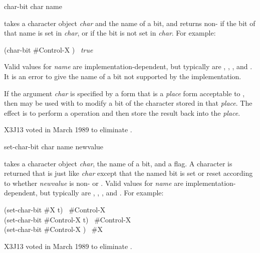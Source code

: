 \begin{obsolete}
\begin{defun}[Function]
char-bit char name

 takes a character object {\it char} and the name of a bit,
and returns non-{\false} if the bit of that name is set in {\it char},
or {\false} if the bit is not set in {\it char}.
For example:
\begin{lisp}
(char-bit \#{\Xbackslash}Control-X ) \EV\ {\it true}
\end{lisp}
Valid values for {\it name}
are implementation-dependent, but typically are ,
, , and .
It is an error to give  the name of a bit not supported
by the implementation.

If the argument {\it char} is specified by a form that is a {\it place} form
acceptable to ,
then  may be used with 
to modify a bit of the character stored in that
{\it place}.
The effect is to perform a  operation
and then store the result back into the {\it place}.
\end{defun}
\end{obsolete}

\begin{newer}
X3J13 voted in March 1989 
to eliminate .
\end{newer}


\begin{obsolete}
\begin{defun}[Function]
set-char-bit char name newvalue

 takes a character object {\it char}, the name of a bit,
and a flag.  A character is returned that is just like {\it char}
except that the named bit is set or reset according to whether
{\it newvalue} is non-{\false} or {\false}.
Valid values for {\it name}
are implementation-dependent, but typically are ,
, , and .
For example:
\begin{lisp}
(set-char-bit \#{\Xbackslash}X  t) \EV\ \#{\Xbackslash}Control-X \\
(set-char-bit \#{\Xbackslash}Control-X  t) \EV\ \#{\Xbackslash}Control-X \\
(set-char-bit \#{\Xbackslash}Control-X  {\false}) \EV\ \#{\Xbackslash}X
\end{lisp}
\end{defun}
\end{obsolete}

\begin{newer}
X3J13 voted in March 1989 
to eliminate .
\end{newer}
